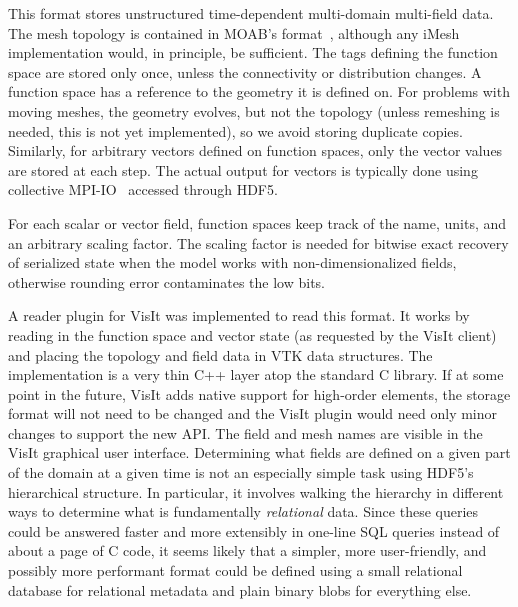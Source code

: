 This format stores unstructured time-dependent multi-domain multi-field data.
The mesh topology is contained in MOAB's format~\cite{moab}, although any iMesh implementation would, in principle, be sufficient.
The tags defining the function space are stored only once, unless the connectivity or distribution changes.
A function space has a reference to the geometry it is defined on.
For problems with moving meshes, the geometry evolves, but not the topology (unless remeshing is needed, this is not yet implemented), so we avoid storing duplicate copies.
Similarly, for arbitrary vectors defined on function spaces, only the vector values are stored at each step.
The actual output for vectors is typically done using collective MPI-IO~\cite{corbett1995overview} accessed through HDF5.

For each scalar or vector field, function spaces keep track of the name, units, and an arbitrary scaling factor.
The scaling factor is needed for bitwise exact recovery of serialized state when the model works with non-dimensionalized fields, otherwise rounding error contaminates the low bits.

A reader plugin for VisIt was implemented to read this format.
It works by reading in the function space and vector state (as requested by the VisIt client) and placing the topology and field data in VTK data structures.
The implementation is a very thin C++ layer atop the standard C library.
If at some point in the future, VisIt adds native support for high-order elements, the storage format will not need to be changed and the VisIt plugin would need only minor changes to support the new API.
The field and mesh names are visible in the VisIt graphical user interface.
Determining what fields are defined on a given part of the domain at a given time is not an especially simple task using HDF5's hierarchical structure.
In particular, it involves walking the hierarchy in different ways to determine what is fundamentally \emph{relational} data.
Since these queries could be answered faster and more extensibly in one-line SQL queries instead of about a page of C code, it seems likely that a simpler, more user-friendly, and possibly more performant format could be defined using a small relational database for relational metadata and plain binary blobs for everything else.
